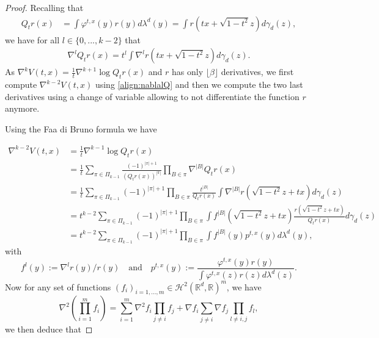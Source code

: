 \documentclass{article}
\begin{document}
\begin{proof}
Recalling that
\begin{align*}
     Q_{t} r(x)&=\int \varphi^{t,x}(y)r(y)d\lambda^d(y)= \int r(tx+\sqrt{1-t^2}z)d\gamma_d(z),
\end{align*}
 we have for all $l\in \{0,...,k-2\}$ that
\begin{align}\label{align:nablalQ}
     \nabla^{l} Q_{t} r(x)=t^l\int \nabla^{l}r(tx+\sqrt{1-t^2}z)d\gamma_d(z).
\end{align}
As $\nabla^{k} V(t,x)= \frac{1}{t}\nabla^{k+1} \log Q_{t} r(x)$ and $r$ has only $\lfloor \beta \rfloor$ derivatives, we first compute $ \nabla^{k-2} V(t,x)$ using \eqref{align:nablalQ} and then we compute the two last derivatives using a change of variable allowing to not differentiate the function $r$ anymore.

Using the Faa di Bruno formula we have

\begin{align*}
    \nabla^{k-2} V(t,x)&=\frac{1}{t}\nabla^{k-1} \log Q_{t} r(x)\\
    & = \frac{1}{t}\sum_{\pi \in \Pi_{k-1}} \frac{(-1)^{|\pi|+1}}{(Q_{t} r(x))^{|\pi|}} \prod_{B\in \pi} \nabla^{|B|} Q_{t} r(x)\\
    & =\frac{1}{t} \sum_{\pi \in \Pi_{k-1}} (-1)^{|\pi|+1} \prod_{B\in \pi} \frac{t^{|B|}}{Q_{t} r(x)} \int \nabla^{|B|}r(\sqrt{1-t^2}z+tx)d\gamma_d(z)\\
    & = t^{k-2}\sum_{\pi \in \Pi_{k-1}} (-1)^{|\pi|+1} \prod_{B\in \pi} \int f^{|B|}(\sqrt{1-t^2}z+tx)\frac{r(\sqrt{1-t^2}z+tx)}{Q_{t} r(x)}d\gamma_d(z)\\
    & = t^{k-2}\sum_{\pi \in \Pi_{k-1}} (-1)^{|\pi|+1} \prod_{B\in \pi} \int f^{|B|}(y)p^{t,x}(y)d\lambda^d(y),
\end{align*}
with
$$ f^{l}(y):=\nabla^l r(y)/r(y)\ \ \ 
\text{ and }\ \ \
p^{t,x}(y):=\frac{ \varphi^{t,x}(y)r(y)}{\int \varphi^{t,x}(z)r(z)d\lambda^d(z)}.$$
Now for any set of functions $(f_i)_{i=1,...,m}\in \mathcal{H}^2(\mathbb{R}^d,\mathbb{R})^m$, we have 
$$\nabla^2 \left(\prod_{i=1}^m f_i\right)= \sum_{i=1}^m \nabla^2 f_i\prod_{j\neq i} f_j+\nabla f_i\sum_{j\neq i} \nabla f_j \prod_{l\neq i,j} f_l,$$
we then deduce that


\end{proof}
\end{document}
